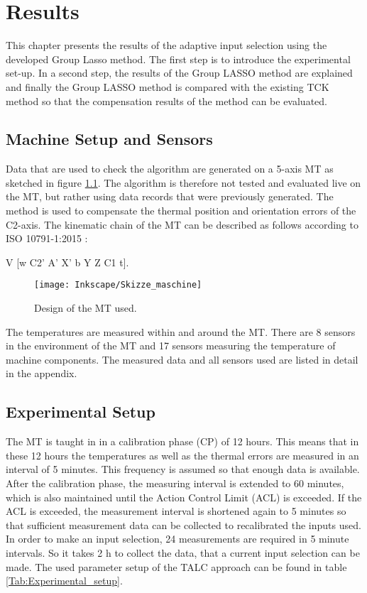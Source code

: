 \chapter{Results}
\label{chp:results}

This chapter presents the results of the adaptive input selection using the developed Group Lasso method. The first step is to introduce the experimental set-up. In a second step, the results of the Group LASSO method are explained and finally the Group LASSO method is compared with the existing TCK method so that the compensation results of the method can be evaluated.


\section{Machine Setup and Sensors}
\label{sec:machine_setup}

Data that are used to check the algorithm are generated on a 5-axis MT as sketched in figure \ref{fig:Design}. The algorithm is therefore not tested and evaluated live on the MT, but rather using data records that were previously generated. The method is used to compensate the thermal position and orientation errors of the C2-axis. The kinematic chain of the MT can be described as follows according to ISO 10791-1:2015 \cite{ISO_10791}: 

V [w C2' A' X' b Y Z C1 t].

\begin{figure}[!htb]
    \centering
    \texttt{[image: Inkscape/Skizze\_maschine]} %
    \caption[Design of the machine]{Design of the MT used.}
    \label{fig:Design}
\end{figure}

The temperatures are measured within and around the MT. There are 8 sensors in the environment of the MT and 17 sensors measuring the temperature of machine components. The measured data and all sensors used are listed in detail in the appendix.

\section{Experimental Setup}
\label{sec:experimentalsetup}

The MT is taught in in a calibration phase (CP) of 12 hours. This means that in these 12 hours the temperatures as well as the thermal errors are measured in an interval of 5 minutes. This frequency is assumed so that enough data is available. After the calibration phase, the measuring interval is extended to 60 minutes, which is also maintained until the Action Control Limit (ACL) is exceeded. If the ACL is exceeded, the measurement interval is shortened again to 5 minutes so that sufficient measurement data can be collected to recalibrated the inputs used. In order to make an input selection, 24 measurements are required in 5 minute intervals. So it takes 2 h to collect the data, that a current input selection can be made. The used parameter setup of the TALC approach can be found in table \ref{Tab:Experimental_setup}.


